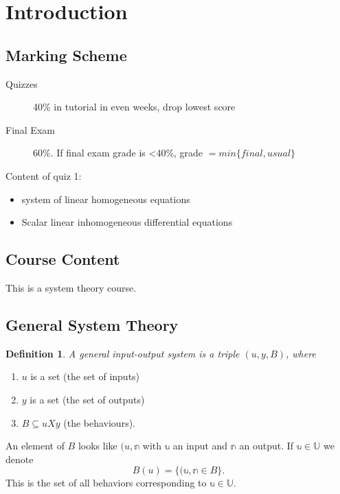 \documentclass[a4paper]{article}
\newtheorem{define}{Definition}
\begin{document}
	
	\section{Introduction}
	\subsection{Marking Scheme}
	\begin{description}
		\item[Quizzes] 40\% in tutorial in even weeks, drop lowest score
		\item[Final Exam] 60\%. If final exam grade is <40\%, grade $=min\{final, usual\}$
	\end{description}
	
	Content of quiz 1:

	\begin{itemize}
		\item system of linear homogeneous equations 
		\item Scalar linear inhomogeneous differential equations 
	\end{itemize}
	

	\subsection{Course Content}
	This is a system theory course. 

	\subsection{General System Theory}
	
	\begin{define}
		A general input-output system is a triple $(u, y, B)$, where
	\end{define} 

	\begin{enumerate}
		\item $u$ is a set (the set of inputs)
		\item $y$ is a set (the set of outputs)
		\item $B \subseteq u X y$ (the behaviours).
	\end{enumerate}



	
	An element of $B$ looks like $(u, \mathbb{n}$ with $\mathbb{u}$ an input and $\mathbb{n}$ an output. If $\mathbb{u} \in \mathbb{U}$ we denote 
	\[
		B(u) = \{(\mathbb{u}, \mathbb{n} \in B\}
	.\]
	This is the set of all behaviors corresponding to $\mathbb{u}\in \mathbb{U}$. 
\end{document}
